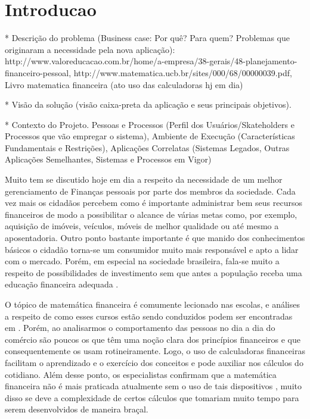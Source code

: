 \chapter{Introducao}

* Descrição do problema (Business case: Por quê? Para quem? Problemas que originaram a necessidade pela nova aplicação): http://www.valoreducacao.com.br/home/a-empresa/38-gerais/48-planejamento-financeiro-pessoal, 
http://www.matematica.ucb.br/sites/000/68/00000039.pdf, Livro matematica financeira (ato uso das calculadoras hj em dia)

* Visão da solução (visão caixa-preta da aplicação e seus principais objetivos).  

* Contexto do Projeto. Pessoas e Processos (Perfil dos Usuários/Skateholders e Processos que vão empregar o sistema), Ambiente de Execução (Características Fundamentais e Restrições), Aplicações Correlatas (Sistemas Legados, Outras Aplicações Semelhantes, Sistemas e Processos em Vigor)

Muito tem se discutido hoje em dia a respeito da necessidade de um melhor gerenciamento de Finanças pessoais por parte dos membros da sociedade. Cada vez mais os cidadãos percebem como é importante administrar bem seus recursos financeiros de modo a possibilitar o alcance de várias metas como, por exemplo, aquisição de imóveis, veículos, móveis de melhor qualidade ou até mesmo a aposentadoria. Outro ponto bastante importante é que manido dos conhecimentos básicos o cidadão torna-se um consumidor muito mais responsável e apto a lidar com o mercado. Porém, em especial na sociedade brasileira, fala-se muito a respeito de possibilidades de investimento sem que antes a população receba uma educação financeira adequada \cite{valoreducacao}. 

O tópico de matemática financeira é comumente lecionado nas escolas, e análises a respeito de como esses cursos estão sendo conduzidos podem ser encontradas em \cite{educacaoMedio}. Porém, ao analisarmos o comportamento das pessoas no dia a dia do comércio são poucos os que têm uma noção clara dos princípios financeiros e que consequentemente os usam rotineiramente. Logo, o uso de calculadoras financeiras facilitam o aprendizado e o exercício dos conceitos e pode auxiliar nos cálculos do cotidiano. Além desse ponto, os especialistas confirmam que a matemática financeira não é mais praticada atualmente sem o uso de tais dispositivos \cite{matFinanceira}, muito disso se deve a complexidade de certos cálculos que tomariam muito tempo para serem desenvolvidos de maneira braçal.

